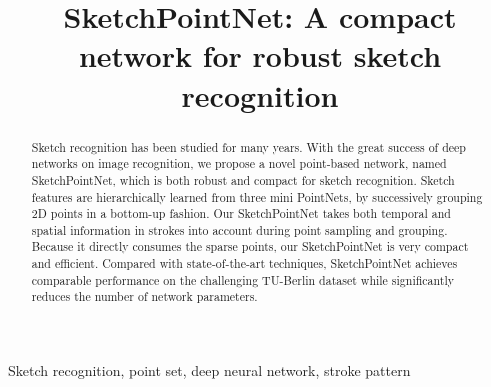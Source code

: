 \documentclass{article}
\title{SketchPointNet: A compact network for robust sketch recognition}
\begin{document}
%
\maketitle
%
\begin{abstract}
Sketch recognition has been studied for many years.
With the great success of deep networks on image recognition, we propose a novel point-based network, named SketchPointNet, which is both robust and compact for sketch recognition.
%
Sketch features are hierarchically learned from three mini PointNets, by successively grouping 2D points in a bottom-up fashion.
%
Our SketchPointNet takes both temporal and spatial information in strokes into account during point sampling and grouping.
%
Because it directly consumes the sparse points, our SketchPointNet is very compact and efficient.
%
Compared with state-of-the-art techniques, SketchPointNet achieves comparable performance on the challenging TU-Berlin dataset while significantly reduces the number of network parameters.


\end{abstract}

\begin{keywords}
Sketch recognition, point set, deep neural network, stroke pattern
\end{keywords}







\end{document}
